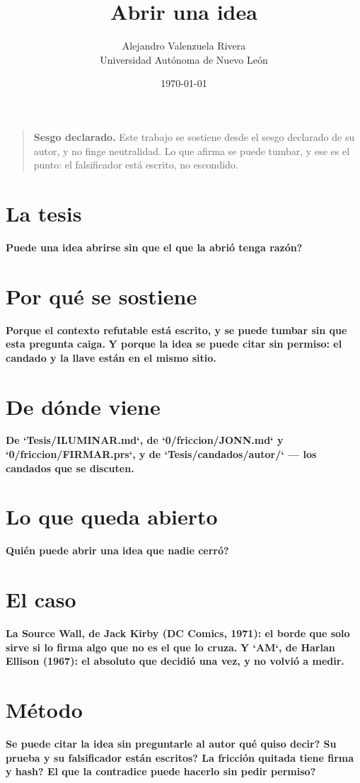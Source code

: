 \documentclass[11pt,a4paper]{article}
\title{Abrir una idea}
\author{Alejandro Valenzuela Rivera\\\small Universidad Autónoma de Nuevo León}
\date{\today}
\begin{document}
\maketitle

\begin{quote}
\textbf{Sesgo declarado.} Este trabajo se sostiene desde el sesgo declarado de su autor, y no finge neutralidad. Lo que afirma se puede tumbar, y ese es el punto: el falsificador está escrito, no escondido.
\end{quote}

\section{La tesis}
\textbf{\textquestiondown{}Puede una idea abrirse sin que el que la abrió tenga razón?}

\section{Por qué se sostiene}
\textbf{Porque el contexto refutable está escrito, y se puede tumbar sin que esta pregunta caiga.} \textbf{Y porque la idea se puede citar sin permiso: el candado y la llave están en el mismo sitio.}

\section{De dónde viene}
\textbf{De `Tesis/ILUMINAR.md`, de `0/friccion/JONN.md` y `0/friccion/FIRMAR.prs`, y de `Tesis/candados/autor/` — los candados que se discuten.}

\section{Lo que queda abierto}
\textbf{\textquestiondown{}Quién puede abrir una idea que nadie cerró?}

\section{El caso}
\textbf{La Source Wall, de Jack Kirby (DC Comics, 1971): el borde que solo sirve si lo firma algo que no es el que lo cruza.} \textbf{Y `AM`, de Harlan Ellison (1967): el absoluto que decidió una vez, y no volvió a medir.}

\section{Método}
\textbf{\textquestiondown{}Se puede citar la idea sin preguntarle al autor qué quiso decir? \textquestiondown{}Su prueba y su falsificador están escritos? \textquestiondown{}La fricción quitada tiene firma y hash? \textquestiondown{}El que la contradice puede hacerlo sin pedir permiso?}
\end{document}
